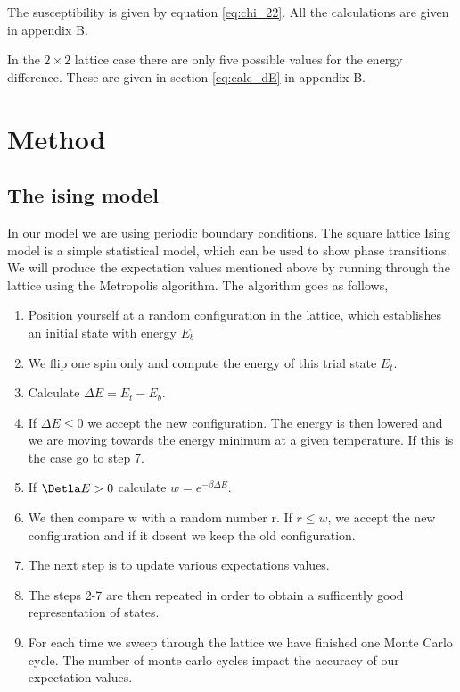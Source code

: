 \documentclass{article}
\begin{document}
\begin{multicols}{2}
The susceptibility is given by equation \ref{eq:chi_22}. All the calculations are given in appendix B.

In the $2\times2$ lattice case there are only five possible values for the energy difference. These are given in section \ref{eq:calc_dE} in appendix B. 

\section{Method}

\subsection{The ising model}

In our model we are using periodic boundary conditions. The square lattice Ising model is a simple statistical model, which can be used to show phase transitions. We will produce the expectation values mentioned above by running through the lattice using the Metropolis algorithm. The algorithm goes as follows,

\begin{enumerate}
  \item Position yourself at a random configuration in the lattice, which establishes an initial state with energy $E_b$
  \item We flip one spin only and compute the energy of this trial state $E_t$.
  \item Calculate $\Delta E=E_t-E_b$.
  \item If $\Delta E\leq0$ we accept the new configuration. The energy is then lowered and we are moving towards the energy minimum at a given temperature. If this is the case go to step 7. 
  \item If $\Detla E> 0$ calculate $w=e^{-\beta \Delta E}$.
  \item We then compare w with a random number r. If $r\leq w$, we accept the new configuration and if it dosent we keep the old configuration. 
  \item The next step is to update various expectations values.
  \item The steps 2-7 are then repeated in order to obtain a sufficently good representation of states. 
  \item For each time we sweep through the lattice we have finished one Monte Carlo cycle. The number of monte carlo cycles impact the accuracy of our expectation values. 
\end{enumerate}


\end{multicols}
\end{document}
